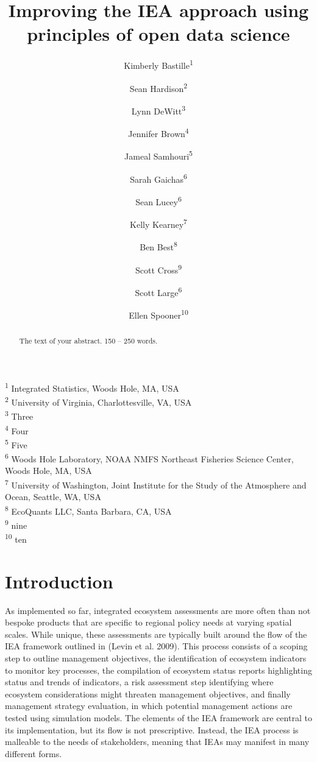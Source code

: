 \documentclass[
]{article}
\title{Improving the IEA approach using principles of open data science}
\author{Kimberly Bastille\textsuperscript{1} \and Sean
Hardison\textsuperscript{2} \and Lynn
DeWitt\textsuperscript{3} \and Jennifer
Brown\textsuperscript{4} \and Jameal
Samhouri\textsuperscript{5} \and Sarah
Gaichas\textsuperscript{6} \and Sean Lucey\textsuperscript{6} \and Kelly
Kearney\textsuperscript{7} \and Ben Best\textsuperscript{8} \and Scott
Cross\textsuperscript{9} \and Scott Large\textsuperscript{6} \and Ellen
Spooner\textsuperscript{10}}
\date{}
\begin{document}
\maketitle
\begin{abstract}
The text of your abstract. 150 -- 250 words.
\end{abstract}

\textsuperscript{1} Integrated Statistics, Woods Hole, MA, USA\\
\textsuperscript{2} University of Virginia, Charlottesville, VA, USA\\
\textsuperscript{3} Three\\
\textsuperscript{4} Four\\
\textsuperscript{5} Five\\
\textsuperscript{6} Woods Hole Laboratory, NOAA NMFS Northeast Fisheries
Science Center, Woods Hole, MA, USA\\
\textsuperscript{7} University of Washington, Joint Institute for the
Study of the Atmosphere and Ocean, Seattle, WA, USA\\
\textsuperscript{8} EcoQuants LLC, Santa Barbara, CA, USA\\
\textsuperscript{9} nine\\
\textsuperscript{10} ten

\hypertarget{intro}{%
\section{Introduction}\label{intro}}

As implemented so far, integrated ecosystem assessments are more often
than not bespoke products that are specific to regional policy needs at
varying spatial scales. While unique, these assessments are typically
built around the flow of the IEA framework outlined in (Levin et al.
2009). This process consists of a scoping step to outline management
objectives, the identification of ecosystem indicators to monitor key
processes, the compilation of ecosystem status reports highlighting
status and trends of indicators, a risk assessment step identifying
where ecosystem considerations might threaten management objectives, and
finally management strategy evaluation, in which potential management
actions are tested using simulation models. The elements of the IEA
framework are central to its implementation, but its flow is not
prescriptive. Instead, the IEA process is malleable to the needs of
stakeholders, meaning that IEAs may manifest in many different forms.
\end{document}
